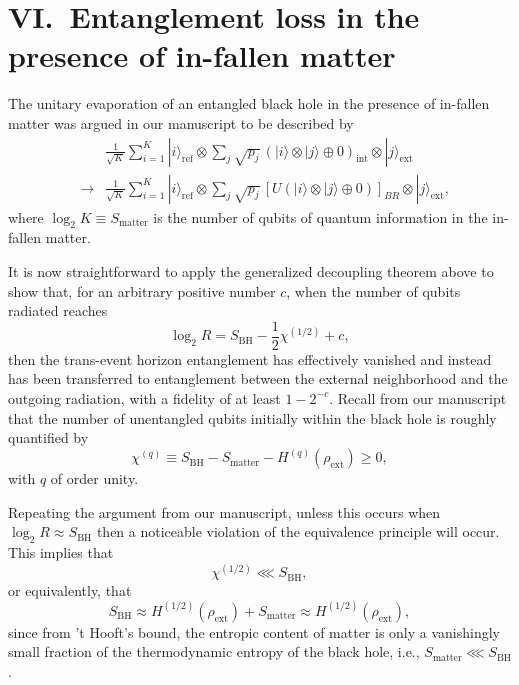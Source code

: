 \documentclass[aps,showpacs,prl,12pt]{revtex4}
\begin{document}
\section{VI.\ Entanglement loss in the presence of in-fallen matter}

The unitary evaporation of an entangled black hole in the
presence of in-fallen matter was argued in our manuscript to be 
described by
\begin{eqnarray}
&&\frac{1}{\sqrt{K}}\sum_{i=1}^K |i\rangle_{\text{ref}}\otimes
\sum_{j}\sqrt{p_j}\,(|i\rangle\otimes |j\rangle\oplus 0)_{\text{int}}
\otimes|j\rangle_{\text{ext}}\label{entUmodelapp} \\
&\rightarrow&
\frac{1}{\sqrt{K}}\sum_{i=1}^K |i\rangle_{\text{ref}}\otimes
\!\sum_{j}\sqrt{p_j}\,[U(|i\rangle\otimes |j\rangle\oplus 0)]_{BR}
\otimes|j\rangle_{\text{ext}}, \nonumber
\end{eqnarray}
where $\log_2 K\equiv S_{\text{matter}}$ is the number of qubits of
quantum information in the in-fallen matter.

It is now straightforward to apply the generalized decoupling
theorem above to show that, for an arbitrary positive number $c$, when 
the number of qubits radiated reaches
\begin{equation}
\log_2 R = S_{\text{BH}}-\frac{1}{2}\chi^{(1/2)} +c,
\end{equation}
then the trans-event horizon entanglement has effectively vanished
and instead has been transferred to entanglement between the
external neighborhood and the outgoing radiation, with
a fidelity of at least $1-2^{-c}$. Recall from our manuscript that
the number of unentangled qubits initially within the black hole
is roughly quantified by
\begin{equation}
\chi^{(q)}\equiv S_{\text{BH}} - S_{\text{matter}}
 -H^{(q)}(\rho_{\text{ext}})\ge 0, \label{chiqapp}
\end{equation}
with $q$ of order unity.

Repeating the argument from our manuscript, unless this occurs
when $\log_2 R \approx S_{\text{BH}}$ then a noticeable violation of
the equivalence principle will occur. This implies that
\begin{equation}
\chi^{(1/2)}\lll S_{\text{BH}},
\end{equation}
or equivalently, that
\begin{equation}
S_{\text{BH}}\approx H^{(1/2)}(\rho_{\text{ext}})+S_{\text{matter}}
\approx H^{(1/2)}(\rho_{\text{ext}}),
\end{equation}
since from 't Hooft's bound, the entropic content of matter
is only a vanishingly small fraction of the thermodynamic entropy
of the black hole, i.e., $S_{\text{matter}}\lll S_{\text{BH}}$.
\end{document}
